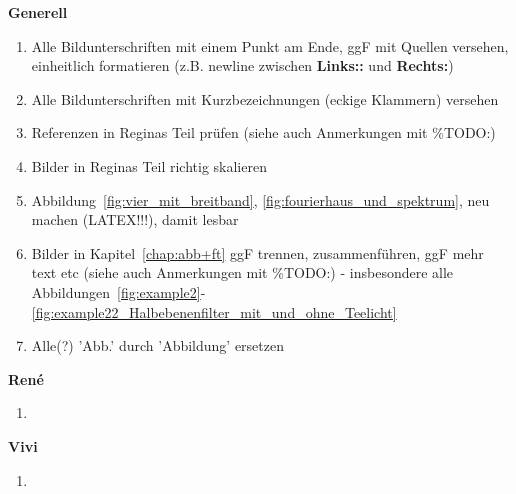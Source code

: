 
\textbf{Generell}
\begin{enumerate}
	\item Alle Bildunterschriften mit einem Punkt am Ende, ggF mit Quellen versehen, einheitlich formatieren (z.B. newline zwischen \textbf{Links::} und \textbf{Rechts:})
	\item Alle Bildunterschriften mit Kurzbezeichnungen (eckige Klammern) versehen
	\item Referenzen in Reginas Teil prüfen (siehe auch Anmerkungen mit \%TODO:)
	\item Bilder in Reginas Teil richtig skalieren
	\item Abbildung~\ref{fig:vier_mit_breitband}, \ref{fig:fourierhaus_und_spektrum}, neu machen (LATEX!!!), damit lesbar
	\item Bilder in Kapitel~\ref{chap:abb+ft} ggF trennen, zusammenführen, ggF mehr text etc (siehe auch Anmerkungen mit \%TODO:) - insbesondere alle Abbildungen~\ref{fig:example2}-\ref{fig:example22_Halbebenenfilter_mit_und_ohne_Teelicht}
	\item Alle(?) 'Abb.' durch 'Abbildung' ersetzen
\end{enumerate}

\textbf{René}
\begin{enumerate}
	\item 
\end{enumerate}

\textbf{Vivi}
\begin{enumerate}
	\item 
\end{enumerate}